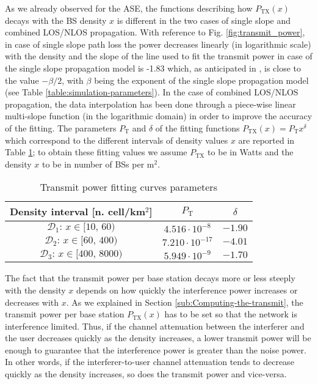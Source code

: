 \documentclass[twocoumn]{IEEEtran}
\begin{document}
As we already observed for the ASE, the functions describing how $P_{\mathrm{TX}}(x)$ decays with the BS density $x$ is different in the two cases of single slope and combined LOS/NLOS propagation. With reference to Fig. \ref{fig:transmit_power}, in case of single slope path loss the power decreases linearly (in logarithmic scale) with the density and 
the slope of the
line used to fit the transmit power in case of the single slope propagation
model is -1.83 which, as anticipated in \cite{Galiotto2013}, is
close to the value $-\beta/2$, with $\beta$ being the exponent
of the single slope propagation model (see Table \eqref{table:simulation-parameters}).
In the case of combined LOS/NLOS propagation, the data interpolation
has been done through a piece-wise linear multi-slope function (in
the logarithmic domain) in order to improve the accuracy of the fitting.
The parameters
$P_{\mathrm{T}}$ and $\delta$ of the fitting functions $P_{\mathrm{TX}}(x)=P_{\mathrm{T}}x^{\delta}$ which correspond to the different
intervals of density values $x$ are reported in Table \ref{table:POWERresults}; to obtain these fitting values we assume  $P_{\mathrm{TX}}$ to be in Watts and the density $x$ to be in number of BSs per m$^2$.

\begin{table}[tbph]
\caption{Transmit power fitting curves parameters}
\label{table:POWERresults}
\centering
\begin{tabular}{|c|c|c|}
\hline 
Density interval [n. cell/km$^{2}$] &  $P_{\mathrm{T}}$ & $\delta$ \tabularnewline
\hline 
\hline 
$\mathcal{D}_{\mathrm{1}}:\,x\in[10,\,60)$ &  $4.516\cdot10^{-8}$ & $-1.90$ \tabularnewline
\hline 
$\mathcal{D}_{\mathrm{2}}:\,x\in[60,\,400)$ &  $7.210\cdot10^{-17}$ & $-4.01$ \tabularnewline
\hline 
$\mathcal{D}_{\mathrm{3}}:\,x\in[400,\,8000)$ &  $5.949\cdot10^{-9}$ & $-1.70$ \tabularnewline
\hline 
\end{tabular}

\end{table}
The fact that the transmit power per base station decays more or less steeply with the density $x$ depends on how quickly the interference power increases or decreases with $x$. As we explained in Section \ref{sub:Computing-the-transmit}, the transmit power per base station $P_{\mathrm{TX}}(x)$ has to be set so that the network is interference limited. Thus, if the channel attenuation between the interferer and the user decreases quickly as the density increases, a lower transmit power will be enough to guarantee that the interference power is greater than the noise power.
In other words, if the interferer-to-user channel attenuation tends to decrease quickly as the density increases, so does the transmit power and vice-versa.
\end{document}
